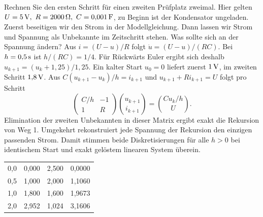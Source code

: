 Rechnen Sie den ersten Schritt für einen zweiten Prüfplatz zweimal. Hier gelten \(U=5\unitm V,\ R=2000\,\Omega,\ C=0{,}001\unitm F\), zu Beginn ist der Kondensator ungeladen. Zuerst beseitigen wir den Strom in der Modellgleichung. Dann lassen wir Strom und Spannung als Unbekannte im Zeitschritt stehen. Was sollte sich an der Spannung ändern?
Aus \(i=(U-u)/R\) folgt \(\dot u=(U-u)/(RC)\). Bei \(h=0{,}5\,\mathrm{s}\) ist \(h/(RC)=1/4\). Für Rückwärts Euler ergibt sich deshalb \(u_{k+1}=(u_k+1{,}25)/1{,}25\). Ein kalter Start \(u_0=0\) liefert zuerst \(1\,\mathrm{V}\), im zweiten Schritt \(1{,}8\,\mathrm{V}\).
Aus \(C(u_{k+1}-u_k)/h=i_{k+1}\) und \(u_{k+1}+R i_{k+1}=U\) folgt pro Schritt
\[
 \begin{pmatrix}C/h&-1\\1&R\end{pmatrix}
 \binom{u_{k+1}}{i_{k+1}}=\binom{C u_k/h}{U}.
\]
Elimination der zweiten Unbekannten in dieser Matrix ergibt exakt die Rekursion von Weg 1. Umgekehrt rekonstruiert jede Spannung der Rekursion den einzigen passenden Strom. Damit stimmen beide Diskretisierungen für alle \(h>0\) bei identischem Start und exakt gelöstem linearen System überein.
{\tblstart\begin{tabularx}{\linewidth}{@{}rYYY@{}}\toprule
{}&&&\\,0 &0,000&2,500&0,0000\\
0,5 &1,000&2,000&1,1060\\
1,0 &1,800&1,600&1,9673\\
2,0 &2,952&1,024&3,1606\\\bottomrule\end{tabularx}\par}

